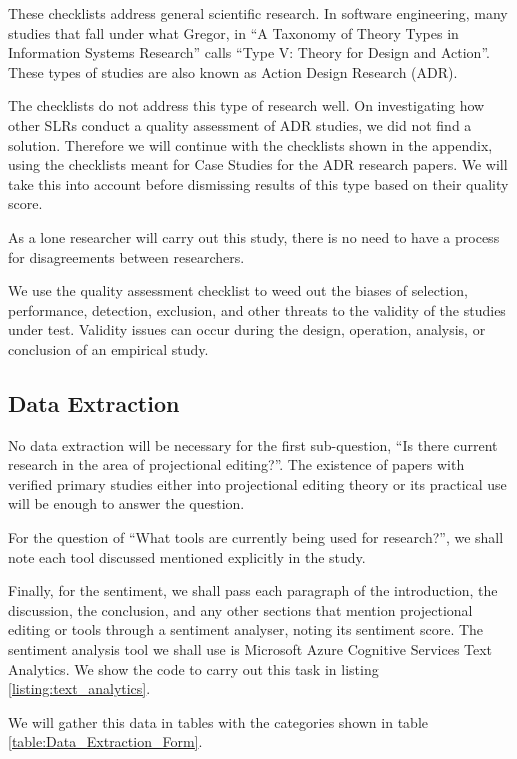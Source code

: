 These checklists address general scientific research.
In software engineering, many studies that fall under what Gregor\cite{gregor2006nature}, in ``A Taxonomy of Theory Types in Information Systems Research'' calls ``Type V: Theory for Design and Action''.
These types of studies are also known as Action Design Research (ADR).

The checklists do not address this type of research well.
On investigating how other SLRs conduct a quality assessment of ADR studies, we did not find a solution.
Therefore we will continue with the checklists shown in the appendix, using the checklists meant for Case Studies for the ADR research papers.
We will take this into account before dismissing results of this type based on their quality score.

As a lone researcher will carry out this study, there is no need to have a process for disagreements between researchers.

We use the quality assessment checklist to weed out the biases of selection, performance, detection, exclusion, and other threats to the validity of the studies under test.
Validity issues can occur during the design, operation, analysis, or conclusion of an empirical study.

\subsection{Data Extraction}
\label{section:dataExtraction}
No data extraction will be necessary for the first sub-question,  ``Is there current research in the area of projectional editing?''.
The existence of papers with verified primary studies either into projectional editing theory or its practical use will be enough to answer the question.

For the question of ``What tools are currently being used for research?'', we shall note each tool discussed mentioned explicitly in the study.

Finally, for the sentiment, we shall pass each paragraph of the introduction, the discussion, the conclusion, and any other sections that mention projectional editing or tools through a sentiment analyser, noting its sentiment score.
The sentiment analysis tool we shall use is Microsoft Azure Cognitive Services Text Analytics.
We show the code to carry out this task in listing \ref{listing:text_analytics}.

We will gather this data in tables with the categories shown in table \ref{table:Data_Extraction_Form}.

